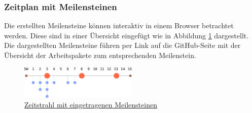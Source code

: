 \subsubsection{Zeitplan mit Meilensteinen}
Die erstellten Meilensteine können interaktiv in einem Browser betrachtet
werden. Diese sind in einer Übersicht eingefügt wie in Abbildung
\ref{fig:milestones} dargestellt. Die dargestellten Meilensteine führen per
Link auf die GitHub-Seite mit der Übersicht der Arbeitspakete zum
entsprechenden Meilenstein.

\begin{figure}[h!]
	\centering
	\includegraphics[width=0.5\textwidth]{../../fig/github/milestones.pdf}
	\caption{\href{github.com/accefa/}{Zeitstrahl mit eingetragenen Meilensteinen}}
	\label{fig:milestones}
\end{figure}

